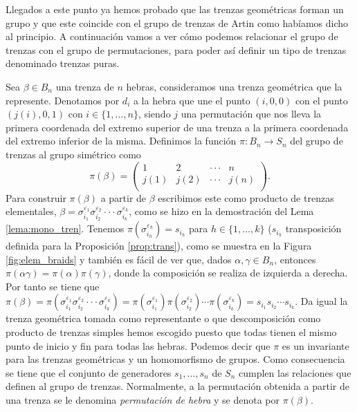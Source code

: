 \documentclass[12pt]{book}
\theoremstyle{definition}
\begin{document}
Llegados a este punto ya hemos probado que las trenzas geométricas forman un grupo y que este coincide con el grupo de trenzas de Artin como habíamos dicho al principio. A continuación vamos a ver cómo podemos relacionar el grupo de trenzas con el grupo de permutaciones, para poder así definir un tipo de trenzas denominado trenzas puras.

Sea $\beta\in B_n$ una trenza de $n$ hebras, consideramos una trenza geométrica que la represente. Denotamos por $d_i$ a la hebra que une el punto $(i,0,0)$ con el punto $(j(i),0,1)$ con $i \in\{ 1,\ldots,n\}$, siendo $j$ una permutación que nos lleva la primera coordenada del extremo superior de una trenza a la primera coordenada del extremo inferior de la misma. Definimos la función $\pi:B_n\rightarrow S_n$ del grupo de trenzas al grupo simétrico como
$$\pi(\beta) = \begin{pmatrix}
1 & 2 & \cdot\cdot\cdot & n\\
j(1) & j(2) & \cdot\cdot\cdot & j(n)\\
\end{pmatrix}. $$
Para construir $\pi(\beta)$ a partir de $\beta$ escribimos este como producto de trenzas elementales, $\beta = \sigma_{i_1}^{\varepsilon_1}\sigma_{i_2}^{\varepsilon_2}\cdot\cdot\cdot\sigma_{i_k}^{\varepsilon_k}$, como se hizo en la demostración del Lema \ref{lema:mono_tren}. Tenemos $\pi(\sigma_{i_h}^{\varepsilon_h})=s_{i_h}$ para $h\in\{1,\ldots,k\}$ ($s_{i_h}$ transposición definida para la Proposición \ref{prop:trans}), como se muestra en la Figura \ref{fig:elem_braids} y también es fácil de ver que, dados $\alpha,\gamma\in B_n$, entonces $\pi(\alpha\gamma)=\pi(\alpha)\pi(\gamma)$, donde la composición se realiza de izquierda a derecha. Por tanto se tiene que $\pi(\beta)=\pi(\sigma_{i_1}^{\varepsilon_1}\sigma_{i_2}^{\varepsilon_2}\cdot\cdot\cdot\sigma_{i_k}^{\varepsilon_k})=\pi(\sigma_{i_1}^{\varepsilon_1})\pi(\sigma_{i_2}^{\varepsilon_2})\cdots \pi(\sigma_{i_k}^{\varepsilon_k})=s_{i_1}s_{i_2}\cdots s_{i_k}$.
Da igual la trenza geométrica tomada como representante o que descomposición como producto de trenzas simples hemos escogido puesto que todas tienen el mismo punto de inicio y fin para todas las hebras. Podemos decir que $\pi$ es un invariante para las trenzas geométricas y un homomorfismo de grupos. Como consecuencia se tiene que el conjunto de generadores $s_1,\ldots,s_n$ de $S_n$ cumplen las relaciones que definen al grupo de trenzas. Normalmente, a la permutación obtenida a partir de una trenza se le denomina \textit{permutación de hebra} y se denota por $\pi(\beta)$.
\end{document}
